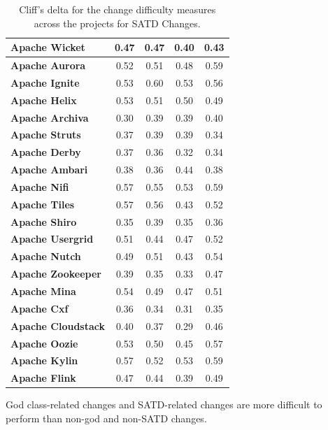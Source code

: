 {\begin{landscape}
\begin{table}[!htbp]
\begin{tabular}{l|c|c|c|c}
			\textbf{Apache Wicket} & 0.47 & 0.47 & 0.40 & 0.43
\\ \hline
			\textbf{Apache Aurora} & 0.52 & 0.51 & 0.48 & 0.59
\\ \hline
			\textbf{Apache Ignite} & 0.53 & 0.60 & 0.53 & 0.56
\\ \hline
			\textbf{Apache Helix} & 0.53 & 0.51 & 0.50 & 0.49
\\ \hline
			\textbf{Apache Archiva} & 0.30 & 0.39 & 0.39 & 0.40
\\ \hline
			\textbf{Apache Struts} & 0.37 & 0.39 & 0.39 & 0.34
\\ \hline
			\textbf{Apache Derby} & 0.37 & 0.36 & 0.32 & 0.34
\\ \hline
			\textbf{Apache Ambari} & 0.38 & 0.36 & 0.44 & 0.38
\\ \hline
			\textbf{Apache Nifi} & 0.57 & 0.55 & 0.53 & 0.59
\\ \hline
			\textbf{Apache Tiles} & 0.57 & 0.56 & 0.43 & 0.52
\\ \hline
			\textbf{Apache Shiro} & 0.35 & 0.39 & 0.35 & 0.36
\\ \hline
			\textbf{Apache Usergrid} & 0.51 & 0.44 & 0.47 & 0.52
\\ \hline
			\textbf{Apache Nutch} & 0.49 & 0.51 & 0.43 & 0.54
\\ \hline
			\textbf{Apache Zookeeper} & 0.39 & 0.35 & 0.33 & 0.47
\\ \hline
			\textbf{Apache Mina} & 0.54 & 0.49 & 0.47 & 0.51
\\ \hline
			\textbf{Apache Cxf} & 0.36 & 0.34 & 0.31 & 0.35 \\ \hline
			\textbf{Apache Cloudstack} & 0.40 & 0.37 & 0.29 & 0.46
\\ \hline
			\textbf{Apache Oozie} & 0.53 & 0.50 & 0.45 & 0.57
\\ \hline
			\textbf{Apache Kylin} & 0.57 & 0.52 & 0.53 & 0.59
\\ \hline
			\textbf{Apache Flink} & 0.47 & 0.44 & 0.39 & 0.49 \\ \hline
			
			
			
		\end{tabular}
		\caption{Cliff's delta for the change difficulty measures across the projects for SATD Changes.}
		\label{table:cliff_deltas_RQ4_TD}
	\end{table}
\end{landscape}

\begin{myboxii}
	God class-related changes and SATD-related changes are more difficult to perform than non-god and non-SATD changes.
\end{myboxii}

}
